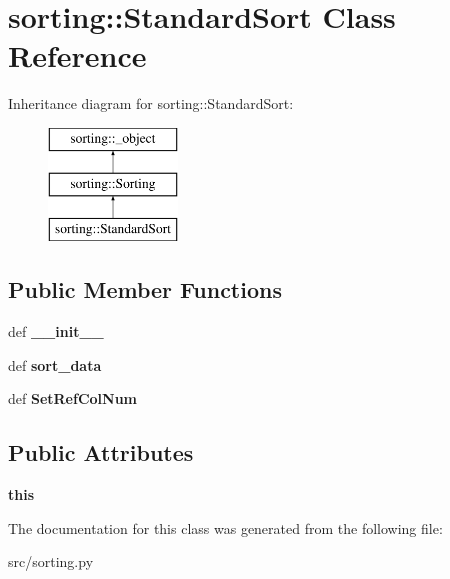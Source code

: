 \hypertarget{classsorting_1_1StandardSort}{
\section{sorting::StandardSort Class Reference}
\label{d2/d3e/classsorting_1_1StandardSort}
}
Inheritance diagram for sorting::StandardSort:\begin{figure}[H]
\begin{center}
\leavevmode
\includegraphics[height=3cm]{d2/d3e/classsorting_1_1StandardSort}
\end{center}
\end{figure}
\subsection*{Public Member Functions}
\begin{DoxyCompactItemize}
\item 
\hypertarget{classsorting_1_1StandardSort_a8f565d310ca5114b4df5c8786b5ded14}{
def {\bfseries \_\-\_\-init\_\-\_\-}}
\label{d2/d3e/classsorting_1_1StandardSort_a8f565d310ca5114b4df5c8786b5ded14}

\item 
\hypertarget{classsorting_1_1StandardSort_a7135230313eba673cb6bb4db808a5188}{
def {\bfseries sort\_\-data}}
\label{d2/d3e/classsorting_1_1StandardSort_a7135230313eba673cb6bb4db808a5188}

\item 
\hypertarget{classsorting_1_1StandardSort_aa42465972d6629637a8954d505c2733b}{
def {\bfseries SetRefColNum}}
\label{d2/d3e/classsorting_1_1StandardSort_aa42465972d6629637a8954d505c2733b}

\end{DoxyCompactItemize}
\subsection*{Public Attributes}
\begin{DoxyCompactItemize}
\item 
\hypertarget{classsorting_1_1StandardSort_a55c05fdd3c2de1fec0fe2312feb70d91}{
{\bfseries this}}
\label{d2/d3e/classsorting_1_1StandardSort_a55c05fdd3c2de1fec0fe2312feb70d91}

\end{DoxyCompactItemize}


The documentation for this class was generated from the following file:\begin{DoxyCompactItemize}
\item 
src/sorting.py\end{DoxyCompactItemize}
